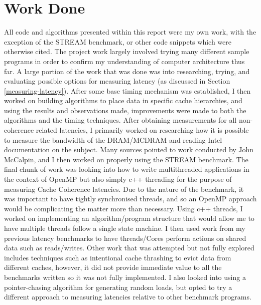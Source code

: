 \documentclass[bsc,frontabs,twoside,singlespacing,parskip,deptreport]{infthesis}     %
\begin{document}
\section{Work Done}
All code and algorithms presented within this report were my own work, with the exception of the STREAM benchmark, or other code snippets which were otherwise cited. The project work largely involved trying many different sample programs in order to confirm my understanding of computer architecture thus far. A large portion of the work that was done was into researching, trying, and evaluating possible options for measuring latency (as discussed in Section \ref{measuring-latency}). After some base timing mechanism was established, I then worked on building algorithms to place data in specific cache hierarchies, and using the results and observations made, improvements were made to both the algorithms and the timing techniques. After obtaining measurements for all non-coherence related latencies, I primarily worked on researching how it is possible to measure the bandwidth of the DRAM/MCDRAM and reading Intel documentation on the subject. Many sources pointed to work conducted by John McCalpin, and I then worked on properly using the STREAM benchmark. The final chunk of work was looking into how to write multithreaded applications in the context of OpenMP but also simply c++ threading for the purpose of measuring Cache Coherence latencies. Due to the nature of the benchmark, it was important to have tightly synchronised threads, and so an OpenMP approach would be complicating the matter more than necessary. Using c++ threads, I worked on implementing an algorithm/program structure that would allow me to have multiple threads follow a single state machine. I then used work from my previous latency benchmarks to have threads/Cores perform actions on shared data such as reads/writes. Other work that was attempted but not fully explored includes techniques such as intentional cache thrashing to evict data from different caches, however, it did not provide immediate value to all the benchmarks written so it was not fully implemented. I also looked into using a pointer-chasing algorithm for generating random loads, but opted to try a different approach to measuring latencies relative to other benchmark programs. 
\end{document}
